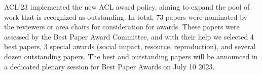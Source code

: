 
ACL'23 implemented the new ACL award policy, aiming to expand the pool of work that is recognized as outstanding. In total, 73 papers were nominated by the reviewers or area chairs for consideration for awards. These papers were assessed by the Best Paper Award Committee, and with their help we selected 4 best papers, 3 special awards (social impact, resource, reproduction), and several dozen outstanding papers. The best and outstanding papers will be announced in a dedicated plenary session for Best Paper Awards on July 10 2023.






